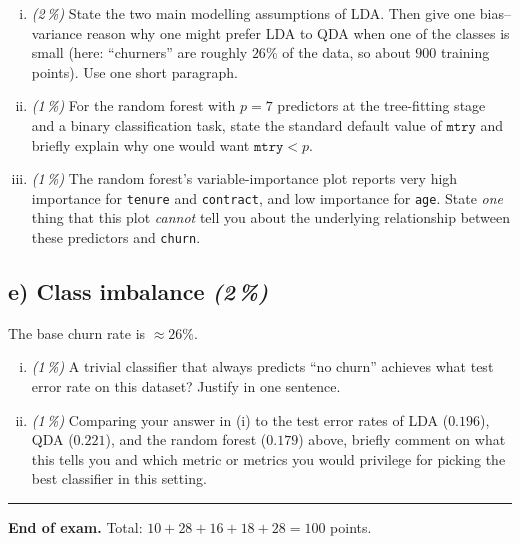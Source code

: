 \documentclass[11pt,a4paper]{article}
\newcommand{\subpoints}[1]{\textit{(#1\,\%)}}
\begin{document}
\begin{enumerate}[(i)]
  \item \subpoints{2} State the two main modelling assumptions of LDA. Then give one bias--variance reason why one might prefer LDA to QDA when one of the classes is small (here: ``churners'' are roughly $26\%$ of the data, so about $900$ training points). Use one short paragraph.
  \item \subpoints{1} For the random forest with $p=7$ predictors at the tree-fitting stage and a binary classification task, state the standard default value of $\mathtt{mtry}$ and briefly explain why one would want $\mathtt{mtry}<p$.
  \item \subpoints{1} The random forest's variable-importance plot reports very high importance for \texttt{tenure} and \texttt{contract}, and low importance for \texttt{age}. State \emph{one} thing that this plot \emph{cannot} tell you about the underlying relationship between these predictors and \texttt{churn}.
\end{enumerate}

\subsection*{e) Class imbalance \subpoints{2}}

The base churn rate is $\approx 26\%$.

\begin{enumerate}[(i)]
  \item \subpoints{1} A trivial classifier that always predicts ``no churn'' achieves what test error rate on this dataset? Justify in one sentence.
  \item \subpoints{1} Comparing your answer in (i) to the test error rates of LDA ($0.196$), QDA ($0.221$), and the random forest ($0.179$) above, briefly comment on what this tells you and which metric or metrics you would privilege for picking the best classifier in this setting.
\end{enumerate}

\vspace{1em}
\hrule
\vspace{0.5em}

\noindent\textbf{End of exam.} \quad Total: $10 + 28 + 16 + 18 + 28 = 100$ points.
\end{document}
